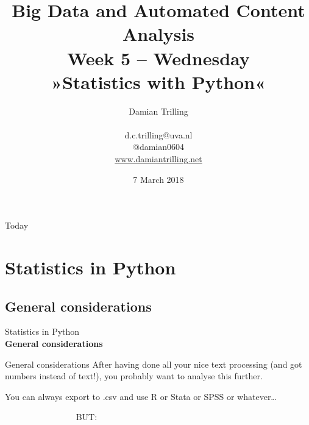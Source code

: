 \documentclass{beamer}
\begin{document}
\title[Big Data and Automated Content Analysis]{\textbf{Big Data and Automated Content Analysis} \\ Week 5 -- Wednesday \\ »Statistics with Python«}
\author[Damian Trilling]{Damian Trilling \\ ~ \\ \footnotesize{d.c.trilling@uva.nl \\@damian0604} \\ \url{www.damiantrilling.net}}
\date{7 March 2018}

\begin{frame}[plain]{}
\titlepage
\end{frame}

\begin{frame}{Today}
\tableofcontents
\end{frame}



\section{Statistics in Python}
\subsection{General considerations}

\begin{frame}[plain]
Statistics in Python\\
\textbf{General considerations}
\end{frame}

\begin{frame}{General considerations}
After having done all your nice text processing (and got numbers instead of text!), you probably want to analyse this further.

You can always export to .csv and use R or Stata or SPSS or whatever\ldots

\vspace{1cm}
\pause

~~~~~~~~~~~~~~~~ \Huge{BUT:}
\end{frame}
\end{document}
